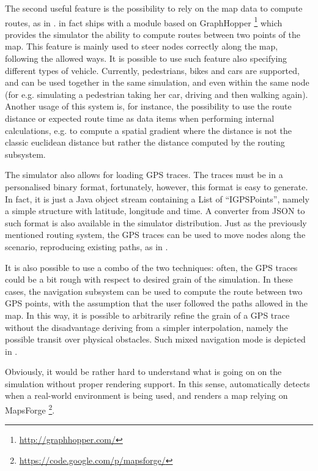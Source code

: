\documentclass[12pt,a4paper,twoside,openright]{book}
\begin{document}
\begin{figure}
 \label{img:traces-navigation}
\end{figure}

The second useful feature is the possibility to rely on the map data to compute routes, as in .
%
\alchemist{} in fact ships with a module based on GraphHopper \footnote{\url{http://graphhopper.com/}} which provides the simulator the ability to compute routes between two points of the map.
%
This feature is mainly used to steer nodes correctly along the map, following the allowed ways.
%
It is possible to use such feature also specifying different types of vehicle.
%
Currently, pedestrians, bikes and cars are supported, and can be used together in the same simulation, and even within the same node (for e.g. simulating a pedestrian taking her car, driving and then walking again).
%
Another usage of this system is, for instance, the possibility to use the route distance or expected route time as data items when performing internal calculations, e.g. to compute a spatial gradient where the distance is not the classic euclidean distance but rather the distance computed by the routing subsystem.

The simulator also allows for loading GPS traces.
%
The traces must be in a personalised binary format, fortunately, however, this format is easy to generate.
%
In fact, it is just a Java object stream containing a List of ``IGPSPoints'', namely a simple structure with latitude, longitude and time.
%
A converter from JSON to such format is also available in the simulator distribution.
%
Just as the previously mentioned routing system, the GPS traces can be used to move nodes along the scenario, reproducing existing paths, as in .

It is also possible to use a combo of the two techniques: often, the GPS traces could be a bit rough with respect to desired grain of the simulation.
%
In these cases, the navigation subsystem can be used to compute the route between two GPS points, with the assumption that the user followed the paths allowed in the map.
%
In this way, it is possible to arbitrarily refine the grain of a GPS trace without the disadvantage deriving from a simpler interpolation, namely the possible transit over physical obstacles.
%
Such mixed navigation mode is depicted in .

Obviously, it would be rather hard to understand what is going on on the simulation without proper rendering support.
%
In this sense, \alchemist{} automatically detects when a real-world environment is being used, and renders a map relying on MapsForge \footnote{\url{https://code.google.com/p/mapsforge/}}.
\end{document}
